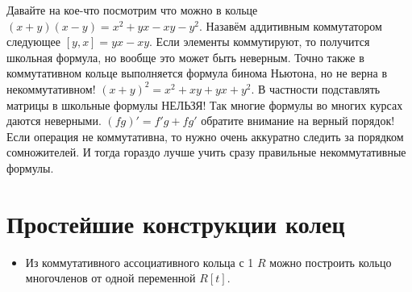 Давайте на кое-что посмотрим что можно в кольце $(x+y)(x-y)=x^2+yx-xy-y^2$.
Назавём аддитивным коммутатором следующее $[y,x]=yx-xy$. Если элементы
коммутируют, то получится школьная формула, но вообще это может быть неверным.
Точно также в коммутативном кольце выполняется формула бинома Ньютона, но не
верна в некоммутативном! $(x+y)^2=x^2+xy+yx+y^2$. В частности подставлять
матрицы в школьные формулы НЕЛЬЗЯ! Так многие формулы во многих курсах даются
неверными. $(fg)'=f'g+fg'$ обратите внимание на верный порядок! Если операция
не коммутативна, то нужно очень аккуратно следить за порядком сомножителей. И
тогда гораздо лучше учить сразу правильные некоммутативные формулы.

\section{Простейшие конструкции колец}
\begin{itemize}
    \item Из коммутативного ассоциативного кольца с 1 $R$ можно построить
        кольцо многочленов от одной переменной $R[t]$.
\end{itemize}

